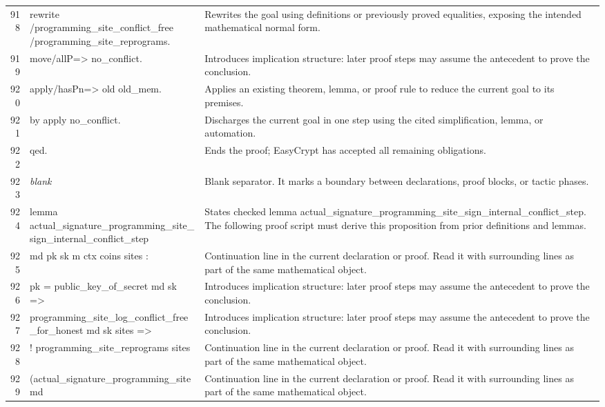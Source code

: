 \documentclass[10pt]{article}
\begin{document}
\begin{longtable}{r L{0.53\textwidth} L{0.37\textwidth}}
918 & {\ttfamily\scriptsize rewrite /programming\_site\_conflict\_free /programming\_site\_reprograms.} & Rewrites the goal using definitions or previously proved equalities, exposing the intended mathematical normal form. \\
919 & {\ttfamily\scriptsize move/allP=> no\_conflict.} & Introduces implication structure: later proof steps may assume the antecedent to prove the conclusion. \\
920 & {\ttfamily\scriptsize apply/hasPn=> old old\_mem.} & Applies an existing theorem, lemma, or proof rule to reduce the current goal to its premises. \\
921 & {\ttfamily\scriptsize by apply no\_conflict.} & Discharges the current goal in one step using the cited simplification, lemma, or automation. \\
922 & {\ttfamily\scriptsize qed.} & Ends the proof; EasyCrypt has accepted all remaining obligations. \\
923 & {\ttfamily\scriptsize \emph{blank}} & Blank separator.  It marks a boundary between declarations, proof blocks, or tactic phases. \\
924 & {\ttfamily\scriptsize lemma actual\_signature\_programming\_site\_sign\_internal\_conflict\_step} & States checked lemma actual\_signature\_programming\_site\_sign\_internal\_conflict\_step.  The following proof script must derive this proposition from prior definitions and lemmas. \\
925 & {\ttfamily\scriptsize   md pk sk m ctx coins sites :} & Continuation line in the current declaration or proof.  Read it with surrounding lines as part of the same mathematical object. \\
926 & {\ttfamily\scriptsize   pk = public\_key\_of\_secret md sk =>} & Introduces implication structure: later proof steps may assume the antecedent to prove the conclusion. \\
927 & {\ttfamily\scriptsize   programming\_site\_log\_conflict\_free\_for\_honest md sk sites =>} & Introduces implication structure: later proof steps may assume the antecedent to prove the conclusion. \\
928 & {\ttfamily\scriptsize   ! programming\_site\_reprograms sites} & Continuation line in the current declaration or proof.  Read it with surrounding lines as part of the same mathematical object. \\
929 & {\ttfamily\scriptsize       (actual\_signature\_programming\_site md} & Continuation line in the current declaration or proof.  Read it with surrounding lines as part of the same mathematical object. \\

\end{longtable}
\end{document}
